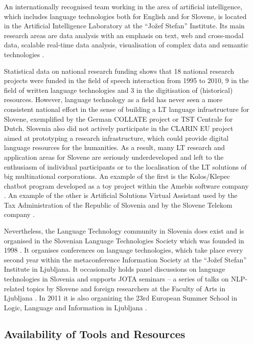 \begin{multicols}{2}
An internationally recognised team working in the area of artificial intelligence, which includes language technologies both for English and for Slovene, is located in the Artificial Intelligence Laboratory at the “Jožef Stefan” Institute. Its main research areas are data analysis with an emphasis on text, web and cross-modal data, scalable real-time data analysis, visualisation of complex data and semantic technologies \cite{Ailab1}.

Statistical data on national research funding shows that 18 national research projects were funded in the field of speech interaction from 1995 to 2010, 9 in the field of written language technologies and 3 in the digitisation of (historical) resources. However, language technology as a field has never seen a more consistent national effort in the sense of building a LT language infrastructure for Slovene, exemplified by the German COLLATE project or TST Centrale for Dutch. Slovenia also did not actively participate in the CLARIN EU project aimed at prototyping a research infrastructure, which could provide digital language resources for the humanities. As a result, many LT research and application areas for Slovene are seriously underdeveloped and left to the enthusiasm of individual participants or to the localisation of the LT solutions of big multinational corporations. An example of the first is the Kolos/Klepec chatbot program developed as a toy project within the Amebis software company \cite{Amb7}.  An example of the other is Artificial Solutions Virtual Assistant used by the Tax Administration of the Republic of Slovenia and by the Slovene Telekom company \cite{Chat1}. 

Nevertheless, the Language Technology community in Slovenia does exist and is organised in the Slovenian Language Technologies Society which was founded in 1998 \cite{SDJT1}. It organises conferences on language technologies, which take place every second year within the metaconference Information Society at the “Jožef Stefan” Institute in Ljubljana.  It occasionally holds panel discussions on language technologies in Slovenia and supports JOTA seminars – a series of talks on NLP-related topics by Slovene and foreign researchers at the Faculty of Arts in Ljubljana \cite{Jota1}. In 2011 it is also organizing the 23rd European Summer School in Logic, Language and Information in Ljubljana \cite{ESSLLI1}.  
  
\subsection{Availability of Tools and Resources}


\end{multicols}

